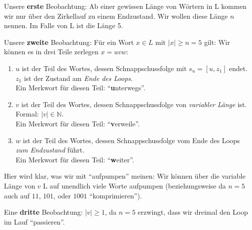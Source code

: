 Unsere \textbf{erste} Beobachtung:
Ab einer gewissen Länge von Wörtern in L kommen wir nur über den Zirkellauf zu einem
Endzustand.
Wir wollen diese Länge $n$ nennen. Im Falle von L ist die Länge 5.

Unsere \textbf{zweite} Beobachtung:
Für ein Wort $x \in L$ mit $|x| \geq n = 5$ gilt: Wir können es in drei Teile zerlegen
$x = uvw$:
\begin{enumerate}
    \item $u$ ist der Teil des Wortes,
        dessen Schnappschussfolge mit $s_u = [u,z_1]$ endet.
        $z_1$ ist der Zustand am \emph{Ende des Loops}.\\
        Ein Merkwort für diesen Teil: ``\textbf{u}nterwegs''.
    \item $v$ ist der Teil des Wortes,
        dessen Schnappschussfolge von \emph{variabler Länge} ist.
        Formal: $|v| \in \mathbb{N}$.\\
        Ein Merkwort für diesen Teil: ``\textbf{v}erweile''.
    \item $w$ ist der Teil des Wortes,
        dessen Schnappschussfolge vom Ende des Loops \emph{zum Endzustand} führt.\\
        Ein Merkwort für diesen Teil: ``\textbf{w}eiter''.
\end{enumerate}
Hier wird klar, was wir mit ``aufpumpen'' meinen:
Wir können über die variable Länge von $v$ L auf unendlich viele Worte aufpumpen
(beziehungsweise da $n = 5$ auch auf $11$, $101$, oder $1001$ ``komprimieren'').

Eine \textbf{dritte} Beobachtung:
$|v| \geq 1$, da $n = 5$ erzwingt,
dass wir dreimal den Loop im Lauf ``passieren''.

